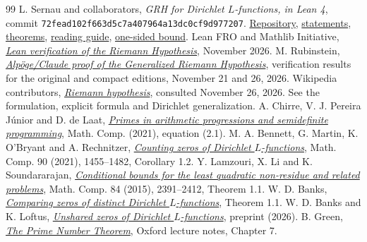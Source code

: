 \documentclass[11pt,letterpaper]{article}
\theoremstyle{remark}\newtheorem{remark}[theorem]{Remark}
\begin{document}
\begin{thebibliography}{99}\small
{} L. Sernau and collaborators, \emph{GRH for Dirichlet $L$-functions, in Lean 4}, commit \texttt{72fead102f663d5c7a407964a13dc0cf9d977207}. \href{https://github.com/lsernau/grh-lean/tree/72fead102f663d5c7a407964a13dc0cf9d977207}{Repository}, \href{https://github.com/lsernau/grh-lean/blob/72fead102f663d5c7a407964a13dc0cf9d977207/grh/src/Statements.lean}{statements}, \href{https://github.com/lsernau/grh-lean/blob/72fead102f663d5c7a407964a13dc0cf9d977207/grh/src/Main.lean}{theorems}, \href{https://github.com/lsernau/grh-lean/blob/72fead102f663d5c7a407964a13dc0cf9d977207/grh/GUIDE.md}{reading guide}, \href{https://github.com/lsernau/grh-lean/blob/72fead102f663d5c7a407964a13dc0cf9d977207/grh/src/New/Reduction/OneSidedBound.lean}{one-sided bound}.
 Lean FRO and Mathlib Initiative, \href{https://leanprover-community.github.io/blog/posts/riemann-hypothesis/}{\emph{Lean verification of the Riemann Hypothesis}}, November 2026.
 M. Rubinstein, \href{https://www.math.uwaterloo.ca/~mrubinst/alpoge_claude_grh/}{\emph{Alp\"oge/Claude proof of the Generalized Riemann Hypothesis}}, verification results for the original and compact editions, November 21 and 26, 2026.
 Wikipedia contributors, \href{https://en.wikipedia.org/wiki/Riemann_hypothesis}{\emph{Riemann hypothesis}}, consulted November 26, 2026. See the formulation, explicit formula and Dirichlet generalization.
 A. Chirre, V. J. Pereira J\'unior and D. de Laat, \href{https://doi.org/10.1090/mcom/3638}{\emph{Primes in arithmetic progressions and semidefinite programming}}, Math. Comp. (2021), equation (2.1).
 M. A. Bennett, G. Martin, K. O'Bryant and A. Rechnitzer, \href{https://doi.org/10.1090/mcom/3599}{\emph{Counting zeros of Dirichlet $L$-functions}}, Math. Comp. 90 (2021), 1455--1482, Corollary 1.2.
 Y. Lamzouri, X. Li and K. Soundararajan, \href{https://arxiv.org/abs/1309.3595}{\emph{Conditional bounds for the least quadratic non-residue and related problems}}, Math. Comp. 84 (2015), 2391--2412, Theorem 1.1.
 W. D. Banks, \href{https://arxiv.org/abs/2302.07073}{\emph{Comparing zeros of distinct Dirichlet $L$-functions}}, Theorem 1.1.
 W. D. Banks and K. Loftus, \href{https://arxiv.org/abs/2607.22930}{\emph{Unshared zeros of Dirichlet $L$-functions}}, preprint (2026).
 B. Green, \href{https://people.maths.ox.ac.uk/greenbj/papers/primenumbers.pdf}{\emph{The Prime Number Theorem}}, Oxford lecture notes, Chapter 7.

\end{thebibliography}
\end{document}
